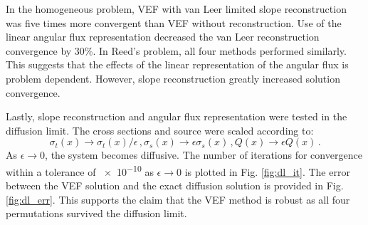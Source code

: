 In the homogeneous problem, VEF with van Leer limited slope reconstruction was five times more convergent than VEF without reconstruction. Use of the linear angular flux representation decreased the van Leer reconstruction convergence by 30\%. In Reed's problem, all four methods performed similarly. This suggests that the effects of the linear representation of the angular flux is problem dependent. However, slope reconstruction greatly increased solution convergence. 

Lastly, slope reconstruction and angular flux representation were tested in the diffusion limit. The cross sections and source were scaled according to: 
	\begin{subequations} \label{res:scaling}
		\begin{equation} 
			\sigma_t(x) \rightarrow \sigma_t(x)/\epsilon \,, 
		\end{equation}
		\begin{equation}
			\sigma_s(x) \rightarrow \epsilon \sigma_s(x) \,,
		\end{equation}
		\begin{equation}
			Q(x) \rightarrow \epsilon Q(x) \,. 
		\end{equation}
	\end{subequations}
As $\epsilon \rightarrow 0$, the system becomes diffusive. The number of iterations for convergence within a tolerance of \num{e-10} as $\epsilon \rightarrow 0$ is plotted in Fig. \ref{fig:dl_it}. The error between the VEF solution and the exact diffusion solution is provided in Fig. \ref{fig:dl_err}. This supports the claim that the VEF method is robust as all four permutations survived the diffusion limit. 
	
